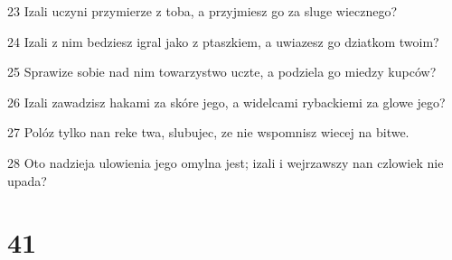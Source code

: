 \par 23 Izali uczyni przymierze z toba, a przyjmiesz go za sluge wiecznego?
\par 24 Izali z nim bedziesz igral jako z ptaszkiem, a uwiazesz go dziatkom twoim?
\par 25 Sprawize sobie nad nim towarzystwo uczte, a podziela go miedzy kupców?
\par 26 Izali zawadzisz hakami za skóre jego, a widelcami rybackiemi za glowe jego?
\par 27 Polóz tylko nan reke twa, slubujec, ze nie wspomnisz wiecej na bitwe.
\par 28 Oto nadzieja ulowienia jego omylna jest; izali i wejrzawszy nan czlowiek nie upada?

\chapter{41}

